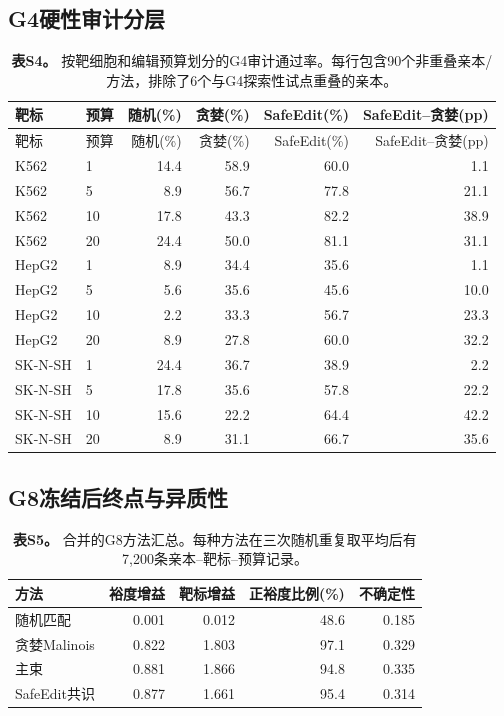 \documentclass[10pt,a4paper]{article}
\begin{document}
\clearpage
\subsection{G4硬性审计分层}

\begin{longtable}{llrrrr}
\caption{\textbf{表S4。} 按靶细胞和编辑预算划分的G4审计通过率。每行包含90个非重叠亲本/方法，排除了6个与G4探索性试点重叠的亲本。}\label{tab:S4}\\
\toprule
靶标 & 预算 & 随机(\%) & 贪婪(\%) & SafeEdit(\%) & SafeEdit--贪婪(pp) \\
\midrule
\endfirsthead
\toprule
靶标 & 预算 & 随机(\%) & 贪婪(\%) & SafeEdit(\%) & SafeEdit--贪婪(pp) \\
\midrule
\endhead
K562 & 1 & 14.4 & 58.9 & 60.0 & 1.1 \\
K562 & 5 & 8.9 & 56.7 & 77.8 & 21.1 \\
K562 & 10 & 17.8 & 43.3 & 82.2 & 38.9 \\
K562 & 20 & 24.4 & 50.0 & 81.1 & 31.1 \\
HepG2 & 1 & 8.9 & 34.4 & 35.6 & 1.1 \\
HepG2 & 5 & 5.6 & 35.6 & 45.6 & 10.0 \\
HepG2 & 10 & 2.2 & 33.3 & 56.7 & 23.3 \\
HepG2 & 20 & 8.9 & 27.8 & 60.0 & 32.2 \\
SK-N-SH & 1 & 24.4 & 36.7 & 38.9 & 2.2 \\
SK-N-SH & 5 & 17.8 & 35.6 & 57.8 & 22.2 \\
SK-N-SH & 10 & 15.6 & 22.2 & 64.4 & 42.2 \\
SK-N-SH & 20 & 8.9 & 31.1 & 66.7 & 35.6 \\
\bottomrule
\end{longtable}

\subsection{G8冻结后终点与异质性}

\begin{table}[ht]
\centering
\caption{\textbf{表S5。} 合并的G8方法汇总。每种方法在三次随机重复取平均后有7,200条亲本--靶标--预算记录。}
\label{tab:S5}
\begin{tabular}{lrrrr}
\toprule
方法 & 裕度增益 & 靶标增益 & 正裕度比例(\%) & 不确定性 \\
\midrule
随机匹配 & 0.001 & 0.012 & 48.6 & 0.185 \\
贪婪Malinois & 0.822 & 1.803 & 97.1 & 0.329 \\
主束 & 0.881 & 1.866 & 94.8 & 0.335 \\
SafeEdit共识 & 0.877 & 1.661 & 95.4 & 0.314 \\
\bottomrule
\end{tabular}
\end{table}
\end{document}
